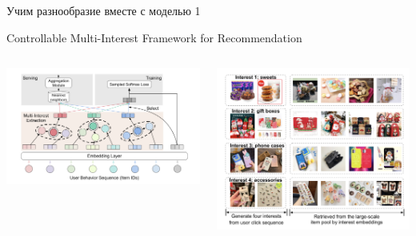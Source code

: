 \documentclass[11pt,aspectratio=169,handout]{beamer}
\begin{document}
\begin{frame}{Учим разнообразие вместе с моделью 1}

\begin{center}
Controllable Multi-Interest Framework for Recommendation \cite{ALIBABA}
\end{center}

\begin{columns}
\begin{column}{0.45\textwidth}
\begin{center}
\includegraphics[scale=0.3]{images/alibaba.png}
\end{center}
\end{column}

\begin{column}{0.45\textwidth} 
\begin{center}
\includegraphics[scale=0.2]{images/divres.png}
\end{center}
\end{column}
\end{columns}

\end{frame}
\end{document}
